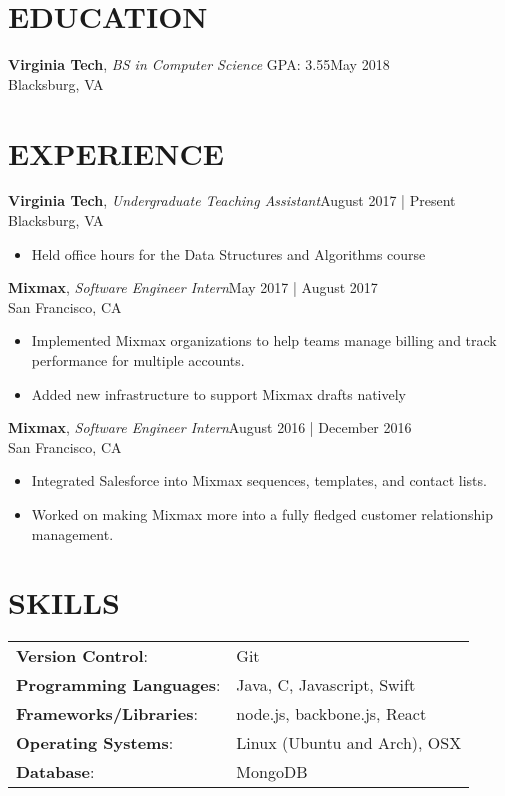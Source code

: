 \documentclass[line,margin]{res}
\begin{document}
\address{vincentl@vt.edu | (703) 992-5598 | github.com/vinnyoodles}
\begin{resume}
	\vspace{-5mm}
	\section{EDUCATION}
	\textbf{Virginia Tech}, {\sl BS in Computer Science} GPA: 3.55\hfill May 2018\\Blacksburg, VA
	\section{EXPERIENCE}
	\textbf{Virginia Tech}, {\sl Undergraduate Teaching Assistant}\hfill August 2017 | Present\\Blacksburg, VA\\\begin{itemize} \itemsep 3pt
	\item Held office hours for the Data Structures and Algorithms course
	\end{itemize}
	\textbf{Mixmax}, {\sl Software Engineer Intern}\hfill May 2017 | August 2017\\San Francisco, CA\\\begin{itemize} \itemsep 3pt
	\item Implemented Mixmax organizations to help teams manage billing and track performance for multiple accounts.
	\item Added new infrastructure to support Mixmax drafts natively
	\end{itemize}
	\textbf{Mixmax}, {\sl Software Engineer Intern}\hfill August 2016 | December 2016\\San Francisco, CA\\\begin{itemize} \itemsep 3pt
	\item Integrated Salesforce into Mixmax sequences, templates, and contact lists.
	\item Worked on making Mixmax more into a fully fledged customer relationship management.
	\end{itemize}
	\section{SKILLS}
	\begin{tabular}{@{}ll}
		\textbf{Version Control}:       & Git                          \\
		\textbf{Programming Languages}: & Java, C, Javascript, Swift   \\
		\textbf{Frameworks/Libraries}:  & node.js, backbone.js, React  \\
		\textbf{Operating Systems}:     & Linux (Ubuntu and Arch), OSX \\
		\textbf{Database}:              & MongoDB                      \\
	\end{tabular}

\end{resume}
\end{document}

